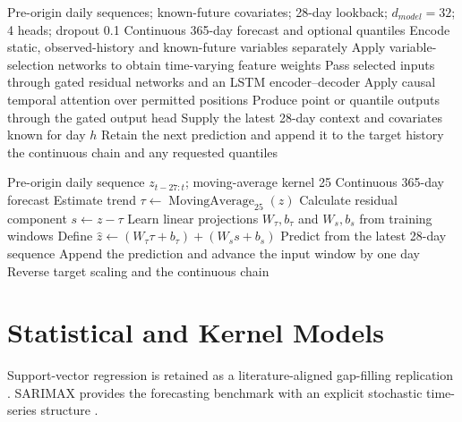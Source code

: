 \begin{algorithm}[H]
\caption{Temporal Fusion Transformer forecasting}
\label{alg:app-tft}
\small
\begin{algorithmic}[1]
\Require Pre-origin daily sequences; known-future covariates; 28-day lookback;
$d_{model}=32$; 4 heads; dropout 0.1
\Ensure Continuous 365-day forecast and optional quantiles
\State Encode static, observed-history and known-future variables separately
\State Apply variable-selection networks to obtain time-varying feature weights
\State Pass selected inputs through gated residual networks and an LSTM encoder--decoder
\State Apply causal temporal attention over permitted positions
\State Produce point or quantile outputs through the gated output head
    \State Supply the latest 28-day context and covariates known for day $h$
    \State Retain the next prediction and append it to the target history
\EndFor
\State \Return the continuous chain and any requested quantiles
\end{algorithmic}
\end{algorithm}

\begin{algorithm}[H]
\caption{DLinear decomposition forecasting}
\label{alg:app-dlinear}
\small
\begin{algorithmic}[1]
\Require Pre-origin daily sequence $z_{t-27:t}$; moving-average kernel 25
\Ensure Continuous 365-day forecast
\State Estimate trend $\tau\gets\operatorname{MovingAverage}_{25}(z)$
\State Calculate residual component $s\gets z-\tau$
\State Learn linear projections $W_\tau,b_\tau$ and $W_s,b_s$ from training windows
\State Define $\hat z\gets(W_\tau\tau+b_\tau)+(W_ss+b_s)$
    \State Predict from the latest 28-day sequence
    \State Append the prediction and advance the input window by one day
\EndFor
\State Reverse target scaling and \Return the continuous chain
\end{algorithmic}
\end{algorithm}

\section{Statistical and Kernel Models}

Support-vector regression is retained as a literature-aligned gap-filling
replication \cite{drucker1997svr}. SARIMAX provides the forecasting benchmark
with an explicit stochastic time-series structure \cite{box2015timeseries}.

